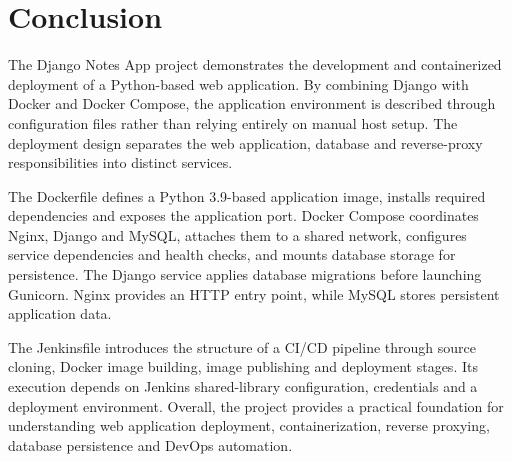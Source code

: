 \documentclass[12pt,a4paper,oneside]{report}
\begin{document}
\chapter*{Conclusion}
The Django Notes App project demonstrates the development and containerized deployment of a Python-based web application. By combining Django with Docker and Docker Compose, the application environment is described through configuration files rather than relying entirely on manual host setup. The deployment design separates the web application, database and reverse-proxy responsibilities into distinct services.

The Dockerfile defines a Python 3.9-based application image, installs required dependencies and exposes the application port. Docker Compose coordinates Nginx, Django and MySQL, attaches them to a shared network, configures service dependencies and health checks, and mounts database storage for persistence. The Django service applies database migrations before launching Gunicorn. Nginx provides an HTTP entry point, while MySQL stores persistent application data.

The Jenkinsfile introduces the structure of a CI/CD pipeline through source cloning, Docker image building, image publishing and deployment stages. Its execution depends on Jenkins shared-library configuration, credentials and a deployment environment. Overall, the project provides a practical foundation for understanding web application deployment, containerization, reverse proxying, database persistence and DevOps automation.
\end{document}
